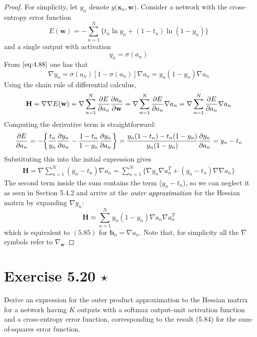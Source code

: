 \begin{proof}
    For simplicity, let $y_n$ denote $y(\mathbf{x}_n, \mathbf{w)}$.
    Consider a network with the cross-entropy error function
    \begin{equation*}\tag{5.21}
        E(\mathbf{w}) = -\sum_{n=1}^{N} \{t_n \ln y_n + (1 - t_n) \ln(1 - y_n)\}
    \end{equation*}
    and a single output with activation
    \[
        y_n = \sigma(a_n)
    \] 
    From $\eqref{eq:4.88}$ one has that
    \[
        \nabla y_n
        = \sigma(a_n)[1 - \sigma(a_n)]\nabla a_n
        = y_n(1 - y_n) \nabla a_n
    \] 
    Using the chain rule of differential calculus,
    \begin{align*}
        \mathbf{H} 
        = \nabla \nabla E(\mathbf{w})
        = \nabla \sum_{n=1}^{N} \pdv{E}{a_n} \pdv{a_n}{\mathbf{w}}
        = \nabla \sum_{n=1}^{N} \pdv{E}{a_n} \nabla a_n
        = \nabla \sum_{n=1}^{N} \pdv{E}{a_n} \nabla a_n
    \end{align*}
    Computing the derivative term is straightforward:
    \[
        \pdv{E}{a_n} 
        = -\bigg\{\frac{t_n}{y_n} \pdv{y_n}{a_n}
        -\frac{1 - t_n}{1 - y_n} \pdv{y_n}{a_n} \bigg\}
        = \frac{y_n(1 - t_n) - t_n(1 - y_n)}{y_n(1 - y_n)} 
        \pdv{y_n}{a_n}
        = y_n - t_n
    \] 
    Substituting this into the initial expression gives
    \begin{align*}
        \mathbf{H} 
        = \nabla  \sum_{n=1}^{N} (y_n - t_n) \nabla a_n
        = \sum_{n=1}^{N} \big\{\nabla y_n \nabla a_n^T + 
        (y_n - t_n) \nabla \nabla a_n\big\}
    \end{align*}
    The second term inside the sum contains the term ($y_n - t_n$), so
    we can neglect it as seen in Section 5.4.2 and arrive at the $\emph{outer 
    approximation}$ for the Hessian matrix by expanding $\nabla y_n$:
    \[
    \mathbf{H} \simeq \sum_{n=1}^{N} y_n(1 - y_n) \nabla a_n \nabla a_n^T
    \] 
    which is equivalent to $(5.85)$ for $\mathbf{b}_n = \nabla a_n$.
    Note that, for simplicity all the $\nabla$ symbols refer to $\nabla_\mathbf{w}$ 
\end{proof}

\section*{Exercise 5.20 $\star$}
Derive an expression for the outer product approximation
to the Hessian matrix for a network having $K$ outputs with a softmax
output-unit activation function and a cross-entropy error function,
corresponding to the result (5.84) for the sum-of-squares error
function.

